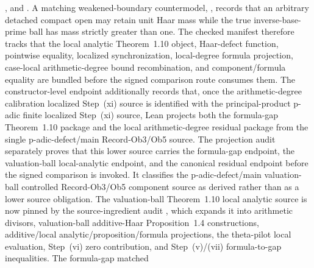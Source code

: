 \begin{proposition}
  ,
  and
  .
  A matching weakened-boundary countermodel,
  ,
  records that an arbitrary detached compact open may retain unit Haar mass
  while the true inverse-base-prime ball has mass strictly greater than one.
  The checked manifest therefore tracks that the local analytic
  Theorem~1.10 object,
  Haar-defect function, pointwise equality, localized synchronization,
  local-degree formula projection, case-local arithmetic-degree bound
  recombination, and component/formula equality are bundled
  before the signed comparison route consumes them.
  The constructor-level endpoint additionally records that, once the
  arithmetic-degree calibration localized Step~(xi) source is identified with
  the principal-product p-adic finite localized Step~(xi) source, Lean projects
  both the formula-gap Theorem~1.10 package and the local arithmetic-degree
  residual package from the single p-adic-defect/main Record-Ob3/Ob5 source.
  The projection audit separately proves that this lower source carries the
  formula-gap endpoint, the valuation-ball local-analytic endpoint, and the
  canonical residual endpoint before the signed comparison is invoked.
  It classifies the p-adic-defect/main valuation-ball controlled Record-Ob3/Ob5
  component source as derived rather than as a lower source obligation.  The
  valuation-ball Theorem~1.10 local analytic source is now pinned by the
  source-ingredient audit
  ,
  which expands it into arithmetic divisors, valuation-ball additive-Haar
  Proposition~1.4 constructions, additive/local analytic/proposition/formula
  projections, the theta-pilot local evaluation, Step~(vi) zero contribution,
  and Step~(v)/(vii) formula-to-gap inequalities.  The formula-gap matched

\end{proposition}
